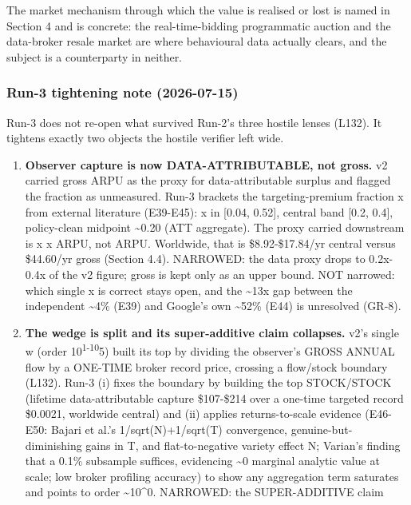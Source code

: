 \documentclass[
  11pt,
]{article}
\begin{document}
The market mechanism through which the value is realised or lost is
named in Section 4 and is concrete: the real-time-bidding programmatic
auction and the data-broker resale market are where behavioural data
actually clears, and the subject is a counterparty in neither.

\subsubsection{Run-3 tightening note
(2026-07-15)}\label{run-3-tightening-note-2026-07-15}

Run-3 does not re-open what survived Run-2's three hostile lenses
(L132). It tightens exactly two objects the hostile verifier left wide.

\begin{enumerate}
\def\labelenumi{\arabic{enumi}.}
\item
  \textbf{Observer capture is now DATA-ATTRIBUTABLE, not gross.} v2
  carried gross ARPU as the proxy for data-attributable surplus and
  flagged the fraction as unmeasured. Run-3 brackets the
  targeting-premium fraction x from external literature (E39-E45): x in
  {[}0.04, 0.52{]}, central band {[}0.2, 0.4{]}, policy-clean midpoint
  \textasciitilde0.20 (ATT aggregate). The proxy carried downstream is x
  x ARPU, not ARPU. Worldwide, that is \$8.92-\$17.84/yr central versus
  \$44.60/yr gross (Section 4.4). NARROWED: the data proxy drops to
  0.2x-0.4x of the v2 figure; gross is kept only as an upper bound. NOT
  narrowed: which single x is correct stays open, and the
  \textasciitilde13x gap between the independent \textasciitilde4\%
  (E39) and Google's own \textasciitilde52\% (E44) is unresolved (GR-8).
\item
  \textbf{The wedge is split and its super-additive claim collapses.}
  v2's single w (order 10\textsuperscript{1-10}5) built its top by
  dividing the observer's GROSS ANNUAL flow by a ONE-TIME broker record
  price, crossing a flow/stock boundary (L132). Run-3 (i) fixes the
  boundary by building the top STOCK/STOCK (lifetime data-attributable
  capture \$107-\$214 over a one-time targeted record \$0.0021,
  worldwide central) and (ii) applies returns-to-scale evidence
  (E46-E50: Bajari et al.'s 1/sqrt(N)+1/sqrt(T) convergence,
  genuine-but-diminishing gains in T, and flat-to-negative variety
  effect N; Varian's finding that a 0.1\% subsample suffices, evidencing
  \textasciitilde0 marginal analytic value at scale; low broker
  profiling accuracy) to show any aggregation term saturates and points
  to order \textasciitilde10\^{}0. NARROWED: the SUPER-ADDITIVE claim

\end{enumerate}
\end{document}
